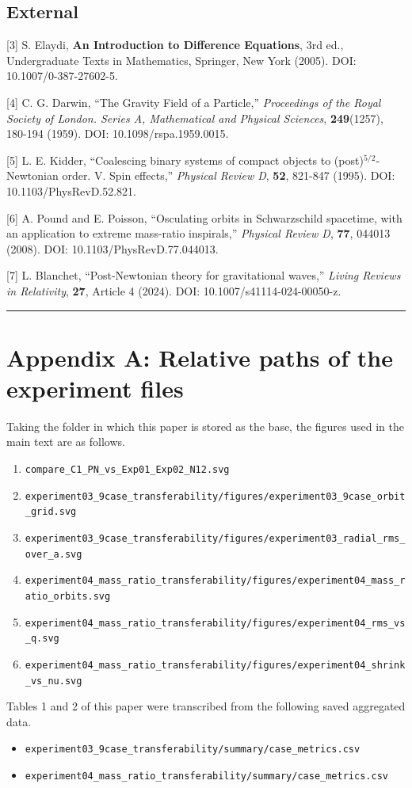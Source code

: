 \documentclass[
  a4paper,
]{article}
\providecommand{\tightlist}{%
  \setlength{\itemsep}{0pt}\setlength{\parskip}{0pt}}
\begin{document}
\subsection{External}\label{external}

{[}3{]} S. Elaydi, \textbf{An Introduction to Difference Equations}, 3rd
ed., Undergraduate Texts in Mathematics, Springer, New York (2005). DOI:
10.1007/0-387-27602-5.

{[}4{]} C. G. Darwin, ``The Gravity Field of a Particle,''
\emph{Proceedings of the Royal Society of London. Series A, Mathematical
and Physical Sciences}, \textbf{249}(1257), 180-194 (1959). DOI:
10.1098/rspa.1959.0015.

{[}5{]} L. E. Kidder, ``Coalescing binary systems of compact objects to
(post)\(^{5/2}\)-Newtonian order. V. Spin effects,'' \emph{Physical
Review D}, \textbf{52}, 821-847 (1995). DOI: 10.1103/PhysRevD.52.821.

{[}6{]} A. Pound and E. Poisson, ``Osculating orbits in Schwarzschild
spacetime, with an application to extreme mass-ratio inspirals,''
\emph{Physical Review D}, \textbf{77}, 044013 (2008). DOI:
10.1103/PhysRevD.77.044013.

{[}7{]} L. Blanchet, ``Post-Newtonian theory for gravitational waves,''
\emph{Living Reviews in Relativity}, \textbf{27}, Article 4 (2024). DOI:
10.1007/s41114-024-00050-z.

\begin{center}\rule{0.5\linewidth}{0.5pt}\end{center}

\section{Appendix A: Relative paths of the experiment
files}\label{appendix-a-relative-paths-of-the-experiment-files}

Taking the folder in which this paper is stored as the base, the figures
used in the main text are as follows.

\begin{enumerate}
\def\labelenumi{\arabic{enumi}.}
\tightlist
\item
  \texttt{compare\_C1\_PN\_vs\_Exp01\_Exp02\_N12.svg}
\item
  \texttt{experiment03\_9case\_transferability/figures/experiment03\_9case\_orbit\_grid.svg}
\item
  \texttt{experiment03\_9case\_transferability/figures/experiment03\_radial\_rms\_over\_a.svg}
\item
  \texttt{experiment04\_mass\_ratio\_transferability/figures/experiment04\_mass\_ratio\_orbits.svg}
\item
  \texttt{experiment04\_mass\_ratio\_transferability/figures/experiment04\_rms\_vs\_q.svg}
\item
  \texttt{experiment04\_mass\_ratio\_transferability/figures/experiment04\_shrink\_vs\_nu.svg}
\end{enumerate}

Tables 1 and 2 of this paper were transcribed from the following saved
aggregated data.

\begin{itemize}
\tightlist
\item
  \texttt{experiment03\_9case\_transferability/summary/case\_metrics.csv}
\item
  \texttt{experiment04\_mass\_ratio\_transferability/summary/case\_metrics.csv}
\end{itemize}
\end{document}
